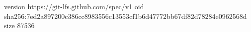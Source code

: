 version https://git-lfs.github.com/spec/v1
oid sha256:7ed2a897200c386cc8983556c13553cf1b6d47772bb67df82d78284e0962568d
size 87536
